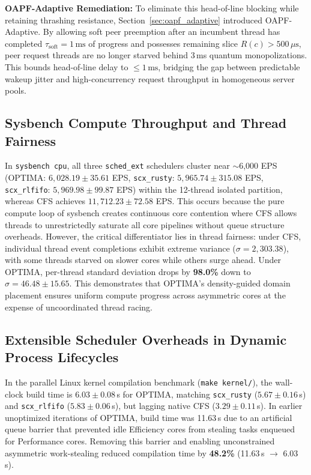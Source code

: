 \documentclass[letterpaper,twocolumn,10pt]{article}
\begin{document}
\textbf{OAPF-Adaptive Remediation:} To eliminate this head-of-line blocking while retaining thrashing resistance, Section~\ref{sec:oapf_adaptive} introduced OAPF-Adaptive. By allowing soft peer preemption after an incumbent thread has completed $\tau_{\mathrm{soft}} = 1\,\mathrm{ms}$ of progress and possesses remaining slice $R(c) > 500\,\mu\mathrm{s}$, peer request threads are no longer starved behind 3\,ms quantum monopolizations. This bounds head-of-line delay to $\le 1\,\mathrm{ms}$, bridging the gap between predictable wakeup jitter and high-concurrency request throughput in homogeneous server pools.

\subsection{Sysbench Compute Throughput and Thread Fairness}
In \texttt{sysbench cpu}, all three \texttt{sched\_ext} schedulers cluster near $\sim$6,000 EPS (OPTIMA: $6{,}028.19 \pm 35.61$ EPS, \texttt{scx\_rusty}: $5{,}965.74 \pm 315.08$ EPS, \texttt{scx\_rlfifo}: $5{,}969.98 \pm 99.87$ EPS) within the 12-thread isolated partition, whereas CFS achieves $11{,}712.23 \pm 72.58$ EPS. This occurs because the pure compute loop of sysbench creates continuous core contention where CFS allows threads to unrestrictedly saturate all core pipelines without queue structure overheads. However, the critical differentiator lies in thread fairness: under CFS, individual thread event completions exhibit extreme variance ($\sigma = 2{,}303.38$), with some threads starved on slower cores while others surge ahead. Under OPTIMA, per-thread standard deviation drops by \textbf{98.0\%} down to $\sigma = 46.48 \pm 15.65$. This demonstrates that OPTIMA's density-guided domain placement ensures uniform compute progress across asymmetric cores at the expense of uncoordinated thread racing.

\subsection{Extensible Scheduler Overheads in Dynamic Process Lifecycles}
In the parallel Linux kernel compilation benchmark (\texttt{make kernel/}), the wall-clock build time is $6.03 \pm 0.08$\,s for OPTIMA, matching \texttt{scx\_rusty} ($5.67 \pm 0.16$\,s) and \texttt{scx\_rlfifo} ($5.83 \pm 0.06$\,s), but lagging native CFS ($3.29 \pm 0.11$\,s). In earlier unoptimized iterations of OPTIMA, build time was 11.63\,s due to an artificial queue barrier that prevented idle Efficiency cores from stealing tasks enqueued for Performance cores. Removing this barrier and enabling unconstrained asymmetric work-stealing reduced compilation time by \textbf{48.2\%} (11.63\,s $\to$ 6.03\,s).
\end{document}

